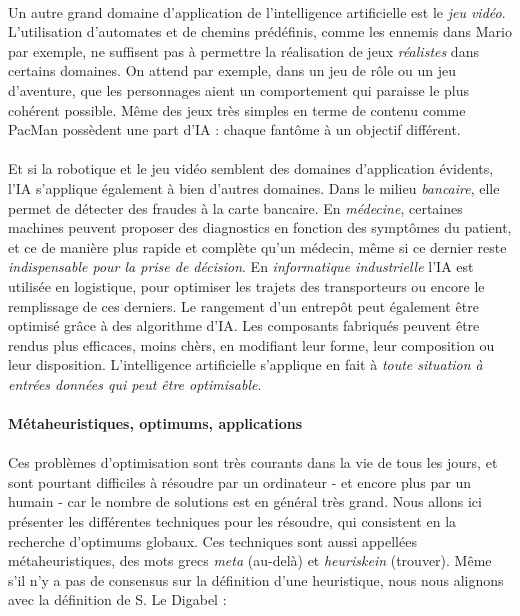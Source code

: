 \paragraph{} Un autre grand domaine d'application de l'intelligence artificielle est le \emph{jeu vidéo}. L'utilisation 
d'automates et de chemins prédéfinis, comme les ennemis dans Mario par exemple, ne suffisent pas à permettre la réalisation
de jeux \emph{réalistes} dans certains domaines. On attend par exemple, dans un jeu de rôle ou un jeu d'aventure, que les
personnages aient un comportement qui paraisse le plus cohérent possible. Même des jeux très simples en terme de contenu
comme PacMan possèdent une part d'IA : chaque fantôme à un objectif différent.

\paragraph{} Et si la robotique et le jeu vidéo semblent des domaines d'application évidents, l'IA s'applique également
à bien d'autres domaines. Dans le milieu \emph{bancaire}, elle permet de détecter des fraudes à la carte bancaire. En
\emph{médecine}, certaines machines peuvent proposer des diagnostics en fonction des symptômes du patient, et ce de
manière plus rapide et complète qu'un médecin, même si ce dernier reste \emph{indispensable pour la prise de décision}.
En \emph{informatique industrielle} l'IA est utilisée en logistique, pour optimiser les trajets des transporteurs ou 
encore le remplissage de ces derniers. Le rangement d'un entrepôt peut également être optimisé grâce à des algorithme d'IA.
Les composants fabriqués peuvent être rendus plus efficaces, moins chèrs, en modifiant leur forme, leur composition ou 
leur disposition. L'intelligence artificielle s'applique en fait à \emph{toute situation à entrées données qui peut
être optimisable}.

\paragraph{Métaheuristiques, optimums, applications}

\paragraph{} Ces problèmes d'optimisation sont très courants dans la vie de tous les jours, et sont pourtant
difficiles à résoudre par un ordinateur - et encore plus par un humain - car le nombre de solutions est en
général très grand. Nous allons ici présenter les différentes techniques pour les résoudre, qui consistent 
en la recherche d'optimums globaux. Ces techniques sont aussi appellées métaheuristiques, des mots grecs \emph{meta}
(au-delà) et \emph{heuriskein} (trouver). Même s'il n'y a pas de consensus sur la définition d'une heuristique, nous
nous alignons avec la définition de S. Le Digabel \cite{Metaheuristics0} :

